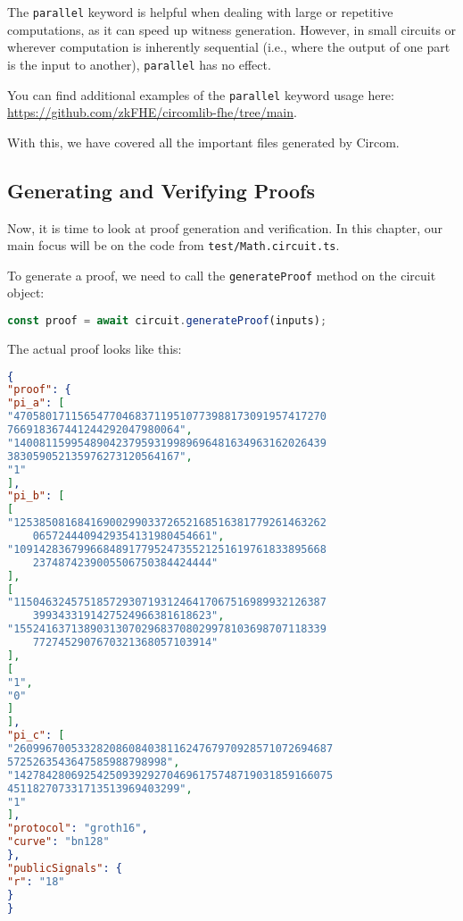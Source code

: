 \documentclass[../lecture-notes-148x210.tex]{subfiles}
\begin{document}
The \texttt{parallel} keyword is helpful when dealing with large or repetitive computations, as it can speed up witness generation.
However, in small circuits or wherever computation is inherently sequential (i.e., where the output of one part is the input to another), \texttt{parallel} has no effect.

You can find additional examples of the \texttt{parallel} keyword usage here: \url{https://github.com/zkFHE/circomlib-fhe/tree/main}.

With this, we have covered all the important files generated by Circom.

\subsection{Generating and Verifying Proofs}

Now, it is time to look at proof generation and verification.
In this chapter, our main focus will be on the code from \texttt{test/Math.circuit.ts}.

To generate a proof, we need to call the \texttt{generateProof} method on the circuit object:

\begin{lstlisting}[language=TypeScript,numbers=none]
const proof = await circuit.generateProof(inputs);
\end{lstlisting}

The actual proof looks like this:
\begin{center}
    \begin{tcolorbox}[enhanced,
        width=0.925\textwidth,
        title=\textbf{proof.json},
        coltitle=gray!25!black,
        attach boxed title to top center={yshift=-2mm,yshifttext=-1mm},
        boxed title style={size=small,colframe=gray!75!black,
        colback=purple!30!white,boxrule=1pt},
        top=-0.35cm,
        bottom=-0.35cm]
        \begin{lstlisting}[language=JSON,numbers=none,basicstyle=\ttfamily\scriptsize]
{
"proof": {
"pi_a": [
"4705801711565477046837119510773988173091957417270
766918367441244292047980064",
"1400811599548904237959319989696481634963162026439
383059052135976273120564167",
"1"
],
"pi_b": [
[
"1253850816841690029903372652168516381779261463262
    0657244409429354131980454661",
"1091428367996684891779524735521251619761833895668
    2374874239005506750384424444"
],
[
"1150463245751857293071931246417067516989932126387
    3993433191427524966381618623",
"1552416371389031307029683708029978103698707118339
    7727452907670321368057103914"
],
[
"1",
"0"
]
],
"pi_c": [
"26099670053328208608403811624767970928571072694687
5725263543647585988798998",
"14278428069254250939292704696175748719031859166075
451182707331713513969403299",
"1"
],
"protocol": "groth16",
"curve": "bn128"
},
"publicSignals": {
"r": "18"
}
}
        \end{lstlisting}
    \end{tcolorbox}
\end{center}
\end{document}
